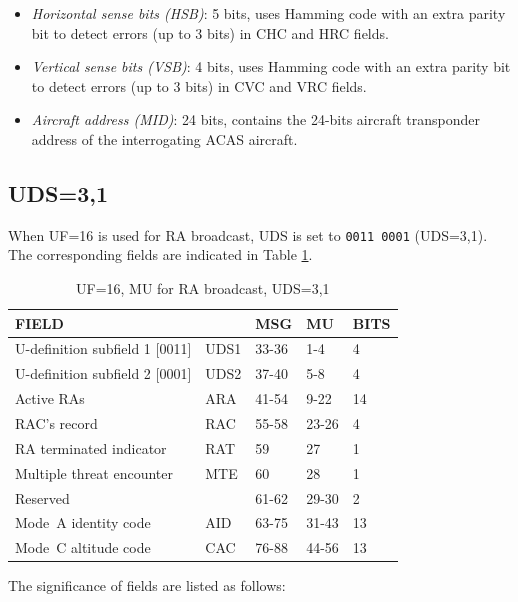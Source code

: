 \begin{itemize}
  \item \emph{Horizontal sense bits (HSB)}: 5 bits, uses Hamming code with an extra parity bit to detect errors (up to 3 bits) in CHC and HRC fields.

  \item \emph{Vertical sense bits (VSB)}: 4 bits, uses Hamming code with an extra parity bit to detect errors (up to 3 bits) in CVC and VRC fields.

  \item \emph{Aircraft address (MID)}: 24 bits, contains the 24-bits aircraft transponder address of the interrogating ACAS aircraft.

\end{itemize}



\subsection{UDS=3,1} \label{sec:acas_ra}

When UF=16 is used for RA broadcast, UDS is set to \texttt{0011 0001} (UDS=3,1). The corresponding fields are indicated in Table \ref{tb:acas_mu_uds31}.

\begin{table}[ht]
\caption{UF=16, MU for RA broadcast, UDS=3,1}
\label{tb:acas_mu_uds31}
\begin{tabular}{|l|l|l|l|l|}
\hline
\textbf{FIELD} & \textbf{} & \textbf{MSG} & \textbf{MU} & \textbf{BITS} \\ \hline
U-definition subfield 1 [0011] & UDS1 & 33-36 & 1-4 & 4 \\ \hline
U-definition subfield 2 [0001] & UDS2 & 37-40 & 5-8 & 4 \\ \hline
Active RAs & ARA & 41-54 & 9-22 & 14 \\ \hline
RAC's record & RAC & 55-58 & 23-26 & 4 \\ \hline
RA terminated indicator & RAT & 59 & 27 & 1 \\ \hline
Multiple threat encounter & MTE & 60 & 28 & 1 \\ \hline
Reserved &  & 61-62 & 29-30 & 2 \\ \hline
Mode~A identity code & AID & 63-75 & 31-43 & 13 \\ \hline
Mode~C altitude code & CAC & 76-88 & 44-56 & 13 \\ \hline
\end{tabular}
\end{table}

The significance of fields are listed as follows:

